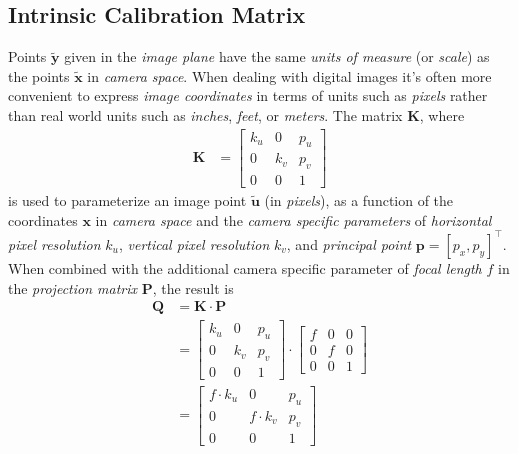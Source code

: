 \subsection{Intrinsic Calibration Matrix}
\par Points $\mathbf{\tilde{y}}$ given in the \textit{image plane} have the same \textit{units of measure} (or \textit{scale}) as the points $\mathbf{\tilde{x}}$ in \textit{camera space}. When dealing with digital images it's often more convenient to express \textit{image coordinates} in terms of units such as \textit{pixels} rather than real world units such as \textit{inches}, \textit{feet}, or \textit{meters}. The matrix $\mathbf{K}$, where
\begin{equation*}
\begin{split}
\mathbf{K}&=\begin{bmatrix}k_u & 0 & p_u\\ 0 & k_v & p_v\\ 0 & 0 & 1\end{bmatrix}
\end{split}
\end{equation*}%
is used to parameterize an image point $\mathbf{\tilde{u}}$ (in \textit{pixels}), as a function of the coordinates $\mathbf{x}$ in \textit{camera space} and the \textit{camera specific parameters} of \textit{horizontal pixel resolution} $k_u$, \textit{vertical pixel resolution} $k_v$, and \textit{principal point} $\mathbf{p}=[p_x,p_y]^\intercal$. When combined with the additional camera specific parameter of \textit{focal length} $f$ in the \textit{projection matrix} $\mathbf{P}$, the result is
\begin{equation*}
\begin{split}
\mathbf{Q}&=\mathbf{K}\cdot\mathbf{P}\\
&=\begin{bmatrix}k_u & 0 & p_u\\ 0 & k_v & p_v\\ 0 & 0 & 1\end{bmatrix}\cdot \begin{bmatrix}f & 0 & 0\\ 0 & f & 0\\ 0 & 0 & 1\end{bmatrix}\\
&=\begin{bmatrix}f\cdot k_u & 0 & p_u\\ 0 & f\cdot k_v & p_v\\ 0 & 0 & 1\end{bmatrix}
\end{split}
\end{equation*}
